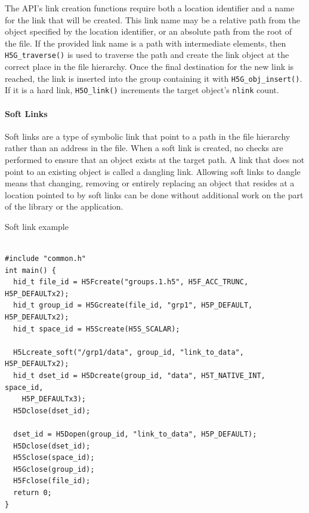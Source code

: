 The API's link creation functions require both a location identifier and a name for the link that will be created. This link name may be a relative path from the object specified by the location identifier, or an absolute path from the root of the file. If the provided link name is a path with intermediate elements, then \texttt{H5G\_traverse()} is used to traverse the path and create the link object at the correct place in the file hierarchy. Once the final destination for the new link is reached, the link is inserted into the group containing it with \texttt{H5G\_obj\_insert()}. If it is a hard link, \texttt{H5O\_link()} increments the target object's \texttt{nlink} count. 

\paragraph{Soft Links} Soft links are a type of symbolic link that point to a path in the file hierarchy rather than an address in the file. When a soft link is created, no checks are performed to ensure that an object exists at the target path. A link that does not point to an existing object is called a dangling link. Allowing soft links to dangle means that changing, removing or entirely replacing an object that resides at a location pointed to by soft links can be done without additional work on the part of the library or the application.

\begin{listing}
\centering
\caption{Soft link example}
\label{lst:soft-link-example}
\begin{verbatim}

#include "common.h"
int main() {
  hid_t file_id = H5Fcreate("groups.1.h5", H5F_ACC_TRUNC, H5P_DEFAULTx2);
  hid_t group_id = H5Gcreate(file_id, "grp1", H5P_DEFAULT, H5P_DEFAULTx2);
  hid_t space_id = H5Screate(H5S_SCALAR);

  H5Lcreate_soft("/grp1/data", group_id, "link_to_data", H5P_DEFAULTx2);
  hid_t dset_id = H5Dcreate(group_id, "data", H5T_NATIVE_INT, space_id, 
    H5P_DEFAULTx3);
  H5Dclose(dset_id);

  dset_id = H5Dopen(group_id, "link_to_data", H5P_DEFAULT);
  H5Dclose(dset_id);
  H5Sclose(space_id);
  H5Gclose(group_id);
  H5Fclose(file_id);
  return 0;
}

\end{verbatim}
\end{listing}

